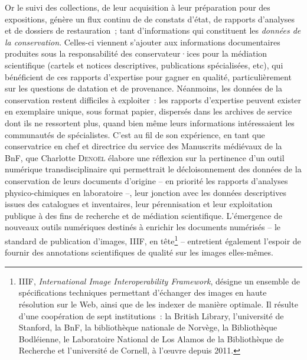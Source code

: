 \documentclass[a4paper,12pt, twoside]{book}
\begin{document}
Or le suivi des collections, de leur acquisition à leur préparation pour des expositions, génère un flux continu de de constats d’état, de rapports d’analyses et de dossiers de restauration~; tant d’informations qui constituent les \textit{données de la conservation}. Celles-ci viennent s’ajouter aux informations documentaires produites sous la responsabilité des conservateur·ices pour la médiation scientifique (cartels et notices descriptives, publications spécialisées, etc), qui bénéficient de ces rapports d’expertise pour gagner en qualité, particulièrement sur les questions de datation et de provenance. Néanmoins, les données de la conservation restent difficiles à exploiter~: les rapports d’expertise peuvent exister en exemplaire unique, sous format papier, dispersés dans les archives de service dont ils ne ressortent plus, quand bien même leurs informations intéressaient les communautés de spécialistes. C’est au fil de son expérience, en tant que conservatrice en chef et directrice du service des Manuscrits médiévaux de la BnF, que Charlotte \textsc{Denoël} élabore une réflexion sur la pertinence d’un outil numérique transdisciplinaire qui permettrait le décloisonnement des données de la conservation de leurs documents d’origine – en priorité les rapports d’analyses physico-chimiques en laboratoire –, leur jonction avec les données descriptives issues des catalogues et inventaires, leur pérennisation et leur exploitation publique à des fins de recherche et de médiation scientifique. L’émergence de nouveaux outils numériques destinés à enrichir les documents numérisés – le standard de publication d’images, IIIF, en tête\footnote{IIIF, \emph{International Image Interoperability Framework}, désigne un ensemble de spécifications techniques permettant d’échanger des images en haute résolution sur le Web, ainsi que de les indexer de manière optimale. Il résulte d’une coopération de sept institutions~: la British Library, l’université de Stanford, la BnF, la bibliothèque nationale de Norvège, la Bibliothèque Bodléienne, le Laboratoire National de Los Alamos de la Bibliothèque de Recherche et l’université de Cornell, à l’œuvre depuis 2011.} – entretient également l’espoir de fournir des annotations scientifiques de qualité sur les images elles-mêmes.
\end{document}
